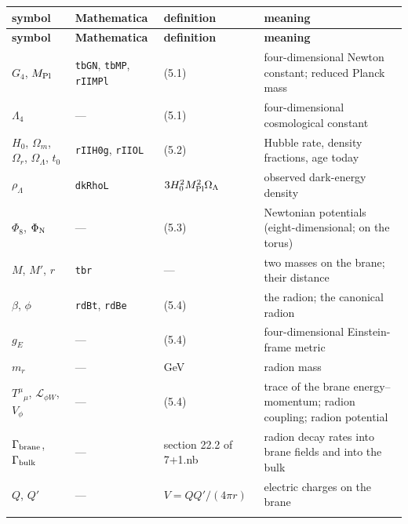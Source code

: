 \documentclass[10pt,a4paper]{article}
\begin{document}
{\footnotesize
\begin{longtable}{>{\raggedright\arraybackslash}p{}>{\raggedright\arraybackslash}p{}>{\raggedright\arraybackslash}p{}>{\raggedright\arraybackslash}p{}}
\toprule
\textbf{symbol} & \textbf{Mathematica} & \textbf{definition} & \textbf{meaning} \\
\midrule\endfirsthead
\toprule
\textbf{symbol} & \textbf{Mathematica} & \textbf{definition} & \textbf{meaning} \\
\midrule\endhead
\endfoot
\bottomrule\endlastfoot
$G_4$, $M_{\rm Pl}$ & \texttt{tbGN}, \texttt{tbMP}, \texttt{rIIMPl} & (5.1) & four-dimensional Newton constant; reduced Planck mass \\
$\Lambda_4$ & — & (5.1) & four-dimensional cosmological constant \\
$H_0$, $\Omega_m$, $\Omega_r$, $\Omega_\Lambda$, $t_0$ & \texttt{rIIH0g}, \texttt{rIIOL} & (5.2) & Hubble rate, density fractions, age today \\
$\rho_\Lambda$ & \texttt{dkRhoL} & $3H_0^2M_{\rm Pl}^2\Omega_\Lambda$ & observed dark-energy density \\
$\Phi_8$, $\Phi_{\rm N}$ & — & (5.3) & Newtonian potentials (eight-dimensional; on the torus) \\
$M$, $M'$, $r$ & \texttt{tbr} & — & two masses on the brane; their distance \\
$\beta$, $\phi$ & \texttt{rdBt}, \texttt{rdBe} & (5.4) & the radion; the canonical radion \\
$g_E$ & — & (5.4) & four-dimensional Einstein-frame metric \\
$m_r$ & — & 10 GeV & radion mass \\
$T^\mu{}_\mu$, $\mathcal L_{\phi W}$, $V_\phi$ & — & (5.4) & trace of the brane energy–momentum; radion coupling; radion potential \\
$\Gamma_{\rm brane}$, $\Gamma_{\rm bulk}$ & — & section 22.2 of 7+1.nb & radion decay rates into brane fields and into the bulk \\
$Q$, $Q'$ & — & $V=QQ'/(4\pi r)$ & electric charges on the brane \\*
\end{longtable}}
\end{document}
